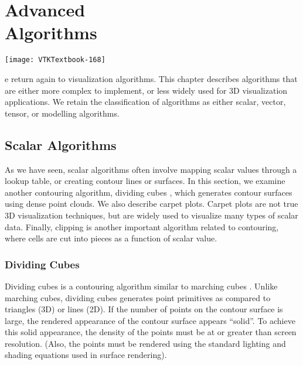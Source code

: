 \chapter[Advanced Algorithms]{Advanced\\ Algorithms}
\label{chap:advanced_algorithms}

\vspace{-9\baselineskip} %
\hfill
 \begin{minipage}{0.5\textwidth}
 \centering
 \texttt{[image: VTKTextbook-168]}
 \end{minipage}
\vspace{2\baselineskip}

e return again to visualization algorithms.
This chapter describes algorithms that are either more complex to implement, or less widely used for 3D visualization applications.
We retain the classification of algorithms as either scalar, vector, tensor, or modelling algorithms.

\section{Scalar Algorithms}

As we have seen, scalar algorithms often involve mapping scalar values through a lookup table, or creating contour lines or surfaces.
In this section, we examine another contouring algorithm, dividing cubes , which generates contour surfaces using dense point clouds.
We also describe carpet plots.
Carpet plots are not true 3D visualization techniques, but are widely used to visualize many types of scalar data.
Finally, clipping is another important algorithm related to contouring, where cells are cut into pieces as a function of scalar value.

\subsection{Dividing Cubes}

Dividing cubes is a contouring algorithm similar to marching cubes \cite{Cline88}. Unlike marching cubes, dividing cubes generates point primitives as compared to triangles (3D) or lines (2D). If the number of points on the contour surface is large, the rendered appearance of the contour surface appears ``solid''.
To achieve this solid appearance, the density of the points must be at or greater than screen resolution. (Also, the points must be rendered using the standard lighting and shading equations used in surface rendering).

